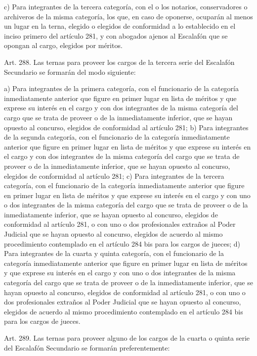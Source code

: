     c) Para integrantes de la tercera categoría, con el o los notarios, conservadores o archiveros de la misma categoría, los que, en caso de oponerse, ocuparán al menos un lugar en la terna, elegido o elegidos de conformidad a lo establecido en el inciso primero del artículo 281, y con abogados ajenos al Escalafón que se opongan al cargo, elegidos por méritos.

    Art. 288. Las ternas para proveer los cargos de la tercera serie del Escalafón Secundario se formarán del modo siguiente:

    a) Para integrantes de la primera categoría, con el funcionario de la categoría inmediatamente anterior que figure en primer lugar en lista de méritos y que exprese su interés en el cargo y con dos integrantes de la misma categoría del cargo que se trata de proveer o de la inmediatamente inferior, que se hayan opuesto al concurso, elegidos de conformidad al artículo 281;
    b) Para integrantes de la segunda categoría, con el funcionario de la categoría inmediatamente anterior que figure en primer lugar en lista de méritos y que exprese su interés en el cargo y con dos integrantes de la misma categoría del cargo que se trata de proveer o de la inmediatamente inferior, que se hayan opuesto al concurso, elegidos de conformidad al artículo 281;
    c) Para integrantes de la tercera categoría, con el funcionario de la categoría inmediatamente anterior que figure en primer lugar en lista de méritos y que exprese su interés en el cargo y con uno o dos integrantes de la misma categoría del cargo que se trata de proveer o de la inmediatamente inferior, que se hayan opuesto al concurso, elegidos de conformidad al artículo 281, o con uno o dos profesionales extraños al Poder Judicial que se hayan opuesto al concurso, elegidos de acuerdo al mismo procedimiento contemplado en el artículo 284 bis para los cargos de jueces;
    d) Para integrantes de la cuarta y quinta categoría, con el funcionario de la categoría inmediatamente anterior que figure en primer lugar en lista de méritos y que exprese su interés en el cargo y con uno o dos integrantes de la misma categoría del cargo que se trata de proveer o de la inmediatamente inferior, que se hayan opuesto al concurso, elegidos de conformidad al artículo 281, o con uno o dos profesionales extraños al Poder Judicial que se hayan opuesto al concurso, elegidos de acuerdo al mismo procedimiento contemplado en el artículo 284 bis para los cargos de jueces.


    Art. 289. Las ternas para proveer alguno de los cargos de la cuarta o quinta serie del Escalafón Secundario se formarán preferentemente:

